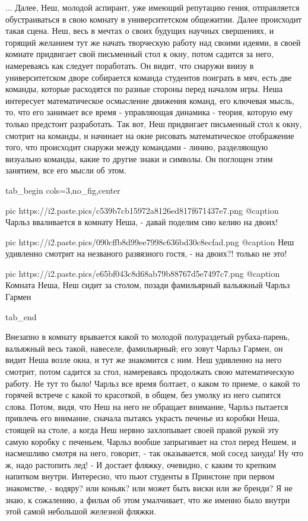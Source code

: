 ... Далее, Неш, молодой аспирант, уже имеющий репутацию гения, отправляется
обустраиваться в свою комнату в университетском общежитии. Далее происходит
такая сцена. Неш, весь в мечтах о своих будущих научных свершениях, и горящий
желанием тут же начать творческую работу над своими идеями, в своей комнате
придвигает свой письменный стол к окну, потом садится за него, намереваясь как
следует поработать.  Он видит, что снаружи внизу в университетском дворе
собирается команда студентов поиграть в мяч, есть две команды, которые
расходятся по разные стороны перед началом игры. Неша интересует математическое
осмысление движения команд, его ключевая мысль, то, что его занимает все время
- управляющая динамика - теория, которую ему только предстоит разработать.  Так
вот, Неш придвигает письменный стол к окну, смотрит на команды, и начинает на
окне рисовать математическое отображение того, что происходит снаружи между
командами - линию, разделяющую визуально команды, какие то другие знаки и
символы.  Он поглощен этим занятием, все его мысли об этом. 

\ifcmt
  tab_begin cols=3,no_fig,center

		 pic https://i2.paste.pics/c539b7cb15972a8126ed817f671437e7.png
		 @caption Чарльз вваливается в комнату Неша, - давай поделим сию келию на двоих!

		 pic https://i2.paste.pics/090cffb8d99ee7998c636bd30c8ecfad.png
		 @caption Неш удивленно смотрит на незваного развязного гостя, - на двоих?! только не это!

     pic https://i2.paste.pics/e65bf043c8d68ab79b88767d5e7497c7.png
		 @caption Комната Неша, Неш сидит за столом, позади фамильярный вальяжный Чарльз Гармен

  tab_end
\fi

Внезапно в комнату
врывается какой то молодой полураздетый рубаха-парень, вальяжный весь такой,
навеселе, фамильярный; его зовут Чарльз Гармен, он видит Неша возле окна, и тут
же знакомится с ним.  Неш удивленно на него смотрит, потом садится за стол,
намереваясь продолжать свою математическую работу. Не тут то было!  Чарльз все
время болтает, о каком то приеме, о какой то горячей встрече с какой то
красоткой, в общем, без умолку из него сыпятся слова.  Потом, видя, что Неш на
него не обращает внимание, Чарльз пытается привлечь его внимание, сначала
пытаясь украсть печенье из коробки Неша, стоящей на столе, а когда Неш нервно
захлопывает своей правой рукой эту самую коробку с печеньем, Чарльз вообше
запрыгивает на стол перед Нешем, и насмешливо смотря на него, говорит, - так
оказывается, мой сосед зануда! Ну что ж, надо растопить лед! - И достает
фляжку, очевидно, с каким то крепким напитком внутри.  Интересно, что пьют
студенты в Принстоне при первом знакомстве, - водяру? или коньяк? или может
быть виски или же бренди?  Я не знаю, к сожалению, а фильм об этом умалчивает,
что же именно было внутри этой самой небольшой железной фляжки. 

